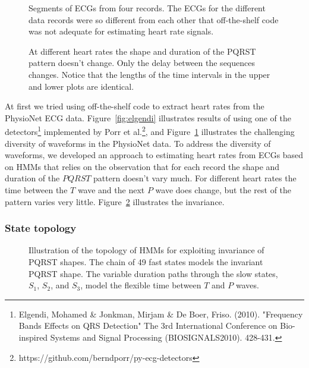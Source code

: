 \begin{figure}
  \caption[Segments of ECGs from four records]%
  {Segments of ECGs from four records.  The ECGs for the different
    data records were so different from each other that off-the-shelf
    code was not adequate for estimating heart rate signals.}
  \label{fig:a03a10b03c02}
\end{figure}

\begin{figure}
  \caption[Invariant PQRST shape]%
  {At different heart rates the shape and duration of the PQRST
    pattern doesn’t change. Only the delay between the sequences
    changes.  Notice that the lengths of the time intervals in the
    upper and lower plots are identical.}
  \label{fig:constant_a03}
\end{figure}

At first we tried using off-the-shelf code to extract heart rates from
the PhysioNet ECG data.  Figure~\ref{fig:elgendi} illustrates results
of using one of the detectors\footnote{Elgendi, Mohamed \& Jonkman,
  Mirjam \& De Boer, Friso. (2010). "Frequency Bands Effects on QRS
  Detection" The 3rd International Conference on Bio-inspired Systems
  and Signal Processing (BIOSIGNALS2010). 428-431.} implemented by
Porr et al.\footnote{https://github.com/berndporr/py-ecg-detectors},
and Figure~\ref{fig:a03a10b03c02} illustrates the challenging
diversity of waveforms in the PhysioNet data.    To address the diversity of
waveforms, we developed an approach to estimating heart rates from
ECGs based on HMMs that relies on the observation that for each record
the shape and duration of the $PQRST$ pattern doesn't vary much.  For
different heart rates the time between the $T$ wave and the next $P$
wave does change, but the rest of the pattern varies very little.
Figure~\ref{fig:constant_a03} illustrates the invariance.

\subsubsection{State topology}
\label{sec:state_topology}

\begin{figure}
  \centering{\resizebox{0.5\textwidth}{!}{}
  }
  \caption[Topology of HMMs for exploiting invariance of PQRST
  shapes]{Illustration of the topology of HMMs for exploiting
    invariance of PQRST shapes. The chain of 49 fast states models the
    invariant PQRST shape.  The variable duration paths through the
    slow states, $S_1$, $S_2$, and $S_3$, model the flexible time
    between $T$ and $P$ waves.}
  \label{fig:ecg_hmm}
\end{figure}

